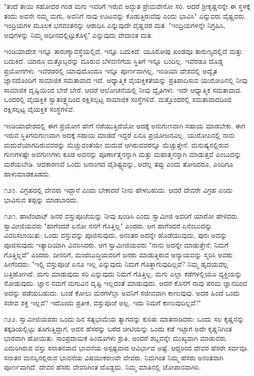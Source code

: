 "ತಂದೆ ತಾಯಿ ಸಹೋದರ ಗಂಡ ಮಗು ಇವರಿಗೆ ಇರುವ ಅದ್ಭುತ ಪ್ರೇಮವೇನೋ ಸರಿ. ಆದರೆ ಶ‍್ರೀಕೃಷ್ಣನನ್ನೇ ಈ ಸ್ಥಳಕ್ಕೆ ತಂದು ಅವನೇ ನಮ್ಮ ಮಗು, ಅವನಿಗೆ ನಾವು ಊಟವನ್ನು ಕೊಡುತ್ತಿರುವೆವು ಎಂದು ಭಾವಿಸಿ" ಎನ್ನುವರು ವೈಷ್ಣವರು. ಇಂದ್ರಿಯಗಳ ಮೂಲಕ ಭಗವಂತನನ್ನು ಆರಾಧಿಸಿ ಎನ್ನುವುದೇ ವೈಷ್ಣವರ ಮತ. "ಇಂದ್ರಿಯಗಳನ್ನೇ ನಿಗ್ರಹಿಸಿ, ಅವುಗಳನ್ನು ನಿಮ್ಮ ಅಧೀನದಲ್ಲಿಟ್ಟುಕೊಳ್ಳಿ" ಎನ್ನುವುದು ವೇದಾಂತ ಮತ.

ಇಂಡಿಯಾದೇಶ ಇನ್ನೂ ತಾರುಣ್ಯಾವಸ್ಥೆಯಲ್ಲಿದೆ, ಇನ್ನೂ ಬದುಕಿದೆ. ಯೂರೋಪು ಖಂಡವೂ ತಾರುಣ್ಯದಲ್ಲಿದೆ ಮತ್ತು ಬದುಕಿದೆ. ಯಾರೂ ಮತ್ತೊಬ್ಬರನ್ನು ದೂರುವ ಬೆಳವಣಿಗೆಯ ಸ್ಥಿತಿಗೆ ಇನ್ನೂ ಬಂದಿಲ್ಲ. ಇವೆರಡೂ ದೊಡ್ಡ ಪ್ರಯೋಗಗಳು. ಇವೆರಡರಲ್ಲಿ ಯಾವುದೊಂದೂ ಇನ್ನೂ ಪೂರ್ಣವಾಗಿಲ್ಲ, ಇಂಡಿಯಾ ದೇಶದಲ್ಲಿ ಅದ್ವೈತ ಜ್ಞಾನದೊಂದಿಗೆ ಸಾಮಾಜಿಕ ಸಮತಾವಾದ ಇದೆ. ಆಧ್ಯಾತ್ಮಿಕ ವೈಯಕ್ತಿಕತೆಯನ್ನು ಪ್ರತಿಪಾದಿಸುವ ಯುರೋಪಿನಲ್ಲಿ ನೀವು ಸಾಮಾಜಿಕ ದೃಷ್ಟಿಯಿಂದ ಬೇರೆ ಬೇರೆ. ಆದರೆ ಆಲೋಚನೆಯಲ್ಲಿ ನೀವು ದ್ವೈತಿಗಳು. ಇದೇ ಆಧ್ಯಾತ್ಮಿಕ ಸಮತಾವಾದ. ಒಂದರಲ್ಲಿ ವೈಯಕ್ತಿಕ ಸ್ವಾತಂತ್ರ್ಯದಿಂದ ರಕ್ಷಿಸಲ್ಪಟ್ಟ ಸಾಮಾಜಿಕ ಸಂಸ್ಥೆಗಳಿವೆ. ಮತ್ತೊಂದರಲ್ಲಿ ಸಮತಾವಾದದಿಂದ ರಕ್ಷಿಸಲ್ಪಟ್ಟ ವೈಯಕ್ತಿಕ ಸಂಸ್ಥೆಗಳಿವೆ.

ಇಂಡಿಯಾದೇಶದಲ್ಲಿ ಈಗ ಪ್ರಯೋಗ ಹೇಗೆ ನಡೆಯುತ್ತಿದೆಯೋ ಅದಕ್ಕೆ ಅನುಗುಣವಾಗಿ ಸಹಾಯ ಮಾಡಬೇಕು. ಈಗ ಇರುವ ಸ್ಥಿತಿಗನುಗುಣವಾಗಿ ಅದಕ್ಕೆ ಸಹಾಯ ಮಾಡದೆ ಇದ್ದರೆ ಏನೂ ಪ್ರಯೋಜನವಿಲ್ಲ. ಯುರೋಪಿನಲ್ಲಿ ನಾನು ಮದುವೆಯಾಗದಿರುವವರನ್ನು ಮೆಚ್ಚುವಂತೆಯೇ ಮದುವೆ ಆಗಿರುವವರನ್ನೂ ಮೆಚ್ಚುತ್ತೇನೆ. ಮನುಷ್ಯನಲ್ಲಿರುವ ಗುಣಗಳಷ್ಟೇ ಅವಗುಣಗಳು ಕೂಡ ಅವನನ್ನು ಪೂರ್ಣಾತ್ಮನನ್ನಾಗಿ ಮತ್ತು ಮಹಾತ್ಮನನ್ನಾಗಿ ಮಾಡುತ್ತವೆ ಎಂಬುದನ್ನು ಮರೆಯಬೇಡಿ. ಆದಕಾರಣವೆ ಒಂದು ಜನಾಂಗದ ವೈಶಿಷ್ಟ್ಯವನ್ನು, ಅದೆಲ್ಲ ತಪ್ಪು ಎಂದು ತೋರಿದರೂ, ಎಂದಿಗೂ ಹಾಳುಮಾಡಕೂಡದು.

೧೨೦. ವಿಗ್ರಹದಲ್ಲಿ ದೇವರು ಇದ್ದಾನೆ ಎಂದು ಬೇಕಾದರೆ ನೀನು ಹೇಳಬಹುದು. ಆದರೆ ದೇವರೇ ವಿಗ್ರಹ ಎಂದು ಭಾವಿಸುವ ತಪ್ಪನ್ನು ಮಾಡಬಾರದು.

೧೨೧. ಹಾಟೆಂಟಾಟ್ ಜನರ ವಸ್ತುಪೂಜೆಯನ್ನು ನೀವು ಖಂಡಿಸಿ ಎಂದು ಸ್ವಾಮೀಜಿ ಅವರಿಗೆ ಯಾರೋ ಹೇಳಿದರು. ಸ್ವಾಮೀಜಿಯವರು "ಹಾಗೆಂದರೆ ಏನೋ ನನಗೆ ಗೊತ್ತಿಲ್ಲ" ಎಂದರು. ಆಗ ಹಾಗೆಂದರೆ ಏನೆಂಬುದನ್ನು ವಿವರಿಸಲಾಯಿತು: ಒಂದು ವಸ್ತುವನ್ನು ಪೂಜಿಸುವುದು, ಅನಂತರ ಅದನ್ನೇ ಹೊಡೆಯುವುದು, ಪುನಃ ಅದನ್ನು ಪೂಜಿಸುವುದು ಇತ್ಯಾದಿಯಾಗಿ ವಿವರಿಸಿದರು. ಆಗ ಸ್ವಾಮೀಜಿಯವರು "ನಾನು ಅದನ್ನೇ ಮಾಡುತ್ತೇನೆ; ನಿಮಗೆ ಗೊತ್ತಿಲ್ಲವೆ" ಎಂದರು. ದೀನರಿಗೆ, ಮಂದಬುದ್ಧಿಯವರಿಗೆ ಜನರು ಮಾಡುತ್ತಿರುವ ಅನ್ಯಾಯವನ್ನು ಸ್ಮರಿಸಿ ಅವರು ಹೀಗೆಂದರು: "ಇಲ್ಲಿ ವಸ್ತುಪೂಜೆ ಏನೂ ಇಲ್ಲ ಎನ್ನುವುದು ನಿಮಗೆ ಗೊತ್ತಾಗುವುದಿಲ್ಲವೆ? ನಿಮ್ಮ ಹೃದಯವೆಲ್ಲ ಬತ್ತಿಹೋಗಿದೆ. ಮಗು ಮಾಡುವುದು ಸರಿ ಎನ್ನುವುದು ನಿಮಗೆ ಗೊತ್ತಿಲ್ಲ. ಮಗು ಎಲ್ಲಾ ಕಡೆಗಳಲ್ಲಿಯೂ ವ್ಯಕ್ತಿಯನ್ನು ನೋಡುವುದು. ಜ್ಞಾನ ನಮಗೆ ಮಗುವಿನ ದೃಷ್ಟಿ ಇಲ್ಲದಂತೆ ಮಾಡುವುದು. ಆದರೆ ಕೊನೆಗೆ ನಾವು ಪರಮ ಜ್ಞಾನದಿಂದ ಅದನ್ನು ಪಡೆಯಬಹುದು. ಬಂಡೆ ಕೋಲು ಮರಗಳೆಲ್ಲಾ ಅವನಿಗೆ ಸಜೀವವಾಗಿ ಕಾಣುವುವು. ಅದರ ಹಿಂದೆ ಒಂದು ಸಜೀವ ಶಕ್ತಿ ಇಲ್ಲವೆ? ಇದೊಂದು ಪ್ರತೀಕ, ವಸ್ತುಪೂಜೆ ಅಲ್ಲ. ಇದು ನಿಮಗೆ ಕಾಣುವುದಿಲ್ಲವೆ?"

೧೨೨. ಸ್ವಾಮೀಜಿಯವರು ಒಂದು ದಿನ ಸತ್ಯಭಾಮೆಯ ತ್ಯಾಗವನ್ನು ಕುರಿತು ಮಾತನಾಡಿದರು: ಒಂದು ಸಲ ಕೃಷ್ಣನನ್ನು ತಕ್ಕಡಿಯಲ್ಲಿಟ್ಟು ತೂಗುತ್ತಿದ್ದಾಗ, ಅವನ ಹೆಸರನ್ನು ಬರೆದ ಚೀಟಿಯನ್ನು ಒಂದು ಕಡೆ ಇಟ್ಟಾಗ ಅದೇ ಕೃಷ್ಣನಿಗಿಂತ ಭಾರವಾಗಿ ಹೋಯಿತು. ಸಾಂಪ್ರದಾಯಿಕ ಹಿಂದೂಗಳು ಶ್ರುತಿ, ಅಂದರೆ ಶಬ್ದವನ್ನೇ ಮುಖ್ಯವಾಗಿ ಮಾಡುವರು. ಎದುರಿಗಿರುವ ವಸ್ತು ಸನಾತನವಾದ ಭಾವನೆಯ ಅಸ್ಪಷ್ಟವಾದ ಆವಿರ್ಭಾವ ಅಷ್ಟೆ. ಆದ್ದರಿಂದ ದೇವರ ಹೆಸರೇ ಸರ್ವವೂ. ಸನಾತನ ಮನಸ್ಸಿನಲ್ಲಿರುವ ಭಾವನೆಯ ವಿಷಯೀಕರಣವೇ ದೇವರು. ನಿಮಗಿಂತ ನಿಮ್ಮ ಹೆಸರು ಅನಂತವಾಗಿ ಪೂರ್ಣವಾಗಿದೆ. ದೇವರ ಹೆಸರು ದೇವರಿಗಿಂತ ದೊಡ್ಡದು. ನಿಮ್ಮ ಮಾತಿನಲ್ಲಿ ಜೋಪಾನವಾಗಿರಿ.

